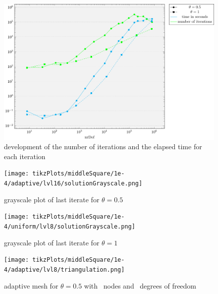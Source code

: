 \documentclass[draft=false,twoside,12pt]{scrreprt}
\begin{document}
\begin{figure}[H]
	\centering
	\includegraphics[width=14cm]{tikzPlots/middleSquare/misc.pdf}
  \caption{development of the number of iterations and the elapsed time for 
  each iteration}
\end{figure}

\begin{minipage}[t]{0.5\textwidth}
  \begin{figure}[H]
	  \centering
		\texttt{[image: tikzPlots/middleSquare/1e-4/adaptive/lvl16/solutionGrayscale.png]}
    \caption{grayscale plot of last iterate for $\theta = 0.5$}
  \end{figure}
\end{minipage}
\begin{minipage}[t]{0.5\textwidth}
  \begin{figure}[H]
	  \centering
		\texttt{[image: tikzPlots/middleSquare/1e-4/uniform/lvl8/solutionGrayscale.png]}
    \caption{grayscale plot of last iterate for $\theta = 1$}
  \end{figure}
\end{minipage}


\begin{figure}[H]
	\centering
  \texttt{[image: tikzPlots/middleSquare/1e-4/adaptive/lvl8/triangulation.png]}
  \caption{adaptive mesh for $\theta = 0.5$ with \nrNodes\ nodes and 
  \nrDof\ degrees of freedom}
\end{figure}

\end{document}
